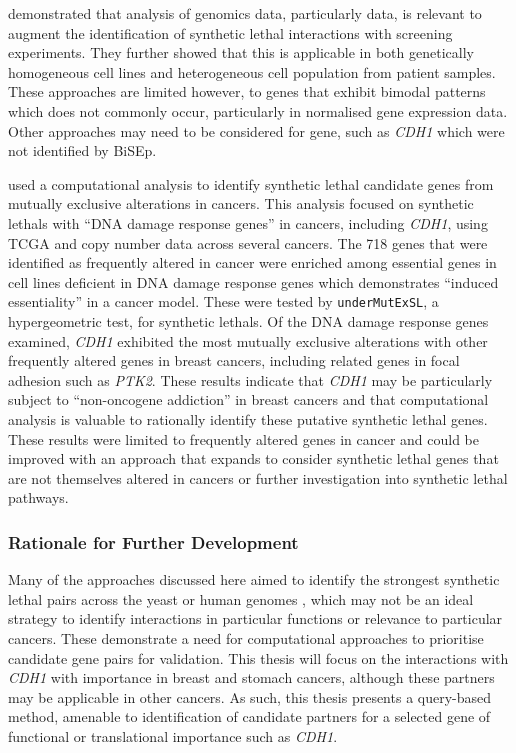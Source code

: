 \citet{Wappett2016} demonstrated that analysis of \glspl{genomic} data, particularly  data, is relevant to augment the identification of \gls{synthetic lethal} interactions with screening experiments. They further showed that this is applicable in both genetically homogeneous cell lines and heterogeneous cell population from patient samples. These approaches are limited however, to genes that exhibit bimodal  patterns which does not commonly occur, particularly in normalised \gls{gene expression} data. Other approaches may need to be considered for gene, such as \textit{CDH1} which were not identified by \gls{BiSEp}.

\citet{Srihari2015} used a computational analysis to identify \gls{synthetic lethal} candidate genes from mutually exclusive alterations in cancers. This analysis focused on \glspl{synthetic lethal} with ``\acrshort{DNA} damage response genes'' in cancers, including \textit{CDH1}, using \gls{TCGA}  and copy number data across several cancers. The 718 genes that were identified as frequently altered in cancer were enriched among essential genes in cell lines deficient in \acrshort{DNA} damage response genes which demonstrates ``induced essentiality'' in a cancer model. These were tested by \texttt{underMutExSL}, a hypergeometric test, for \glspl{synthetic lethal}.  Of the \acrshort{DNA} damage response genes examined, \textit{CDH1} exhibited the most mutually exclusive alterations with other frequently altered genes in breast cancers, including related genes in focal adhesion such as \textit{PTK2}. These results indicate that \textit{CDH1} may be particularly subject to ``\gls{non-oncogene addiction}'' in breast cancers and that computational analysis is valuable to rationally identify these putative \gls{synthetic lethal} genes. These results were limited to frequently altered genes in cancer and could be improved with an approach that expands to consider \gls{synthetic lethal} genes that are not themselves altered in cancers or further investigation into \gls{synthetic lethal} pathways.

\subsubsection{Rationale for Further Development}

Many of the approaches discussed here aimed to identify the strongest \gls{synthetic lethal} pairs across the yeast or human \glspl{genome} \citep{Lu2015, Wappett2016, Deshpande2013, Wu2014}, which may not be an ideal strategy to identify interactions in particular functions or relevance to particular cancers. These demonstrate a need for computational approaches to prioritise candidate gene pairs for validation. This thesis will focus on the interactions with \textit{CDH1} with importance in breast and stomach cancers, although these partners may be applicable in other cancers. As such, this thesis presents a query-based method, amenable to identification of candidate partners for a selected gene of functional or translational importance such as \textit{CDH1}.

